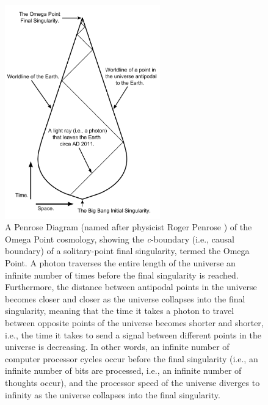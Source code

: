\documentclass[letterpaper,12pt]{article}
\begin{document}
\begin{figure}[htbp]
  \centering
    \includegraphics[width=0.6\textwidth]{Penrose-Omega-Point.pdf}
  \caption[Penrose Diagram of the Omega Point Cosmology]{A Penrose Diagram (named after physicist Roger Penrose \cite{Tipler1987}) of the Omega Point cosmology, showing the \emph{c}-boundary (i.e., causal boundary) of a solitary-point final singularity, termed the Omega Point. A photon traverses the entire length of the universe an infinite number of times before the final singularity is reached. Furthermore, the distance between antipodal points in the universe becomes closer and closer as the universe collapses into the final singularity, meaning that the time it takes a photon to travel between opposite points of the universe becomes shorter and shorter, i.e., the time it takes to send a signal between different points in the universe is decreasing. In other words, an infinite number of computer processor cycles occur before the final singularity (i.e., an infinite number of bits are processed, i.e., an infinite number of thoughts occur), and the processor speed of the universe diverges to infinity as the universe collapses into the final singularity.} 
  \label{fig:Penrose-Omega-Point.pdf}
\end{figure}
\end{document}
